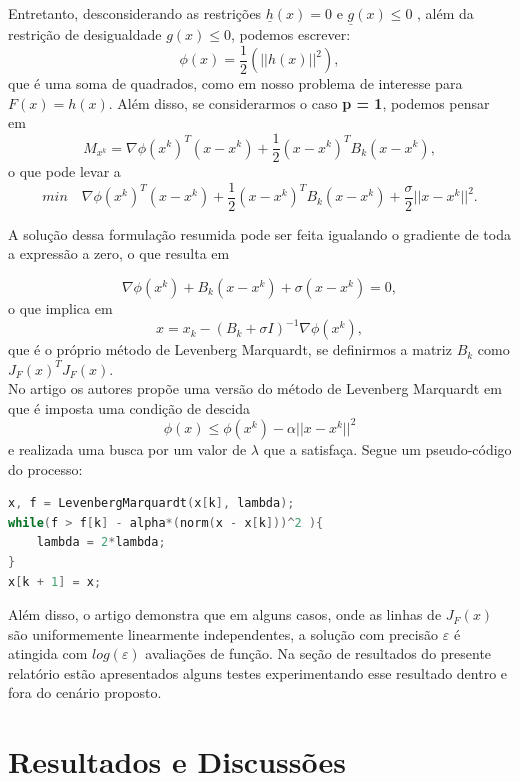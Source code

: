 \documentclass[11pt]{article}
\begin{document}
\noindent
Entretanto, desconsiderando as restrições $\underline{h}(x) = 0$ e $\underline{g}(x) \leq 0$ , além da restrição de desigualdade $g(x) \leq 0$, podemos escrever:
$$\phi (x) = \frac{1}{2}(||h(x)||^2),$$ que é uma soma de quadrados, como em nosso problema de interesse para $F(x)=h(x)$. Além disso, se considerarmos o caso \textbf{p = 1}, podemos pensar em $$M_{x^k} = \nabla \phi(x^k)^T (x - x^k) + \frac{1}{2}(x - x^k)^T B_k (x - x^k),$$ o que pode levar a
$$min \quad \nabla \phi(x^k)^T (x - x^k) + \frac{1}{2}(x - x^k)^T B_k (x - x^k) + \frac{\sigma}{2} ||x - x^k||^2.$$


\noindent
A solução dessa formulação resumida pode ser feita igualando o gradiente de toda a expressão a zero, o que resulta em 

$$\nabla \phi(x^k) + B_k (x - x^k) + \sigma(x - x^k) = 0, $$ 
o que implica em 
$$x = x_k - (B_k + \sigma I)^{-1} \nabla \phi(x^k), $$ que é o próprio método de Levenberg Marquardt, se definirmos a matriz $B_k$ como $J_{F}(x)^T J_{F}(x)$.\\ 


\noindent
No artigo \cite{bmLS} os autores propõe uma versão do método de Levenberg Marquardt em que é imposta uma condição de descida
$$\phi(x) \leq \phi(x^k) - \alpha ||x - x^k||^2$$ e realizada uma busca por um valor de $\lambda$ que a satisfaça. Segue um pseudo-código do processo:

\begin{lstlisting}[language=C, caption=Levenberg Marquardt com busca linear]
x, f = LevenbergMarquardt(x[k], lambda);
while(f > f[k] - alpha*(norm(x - x[k]))^2 ){
	lambda = 2*lambda;
}
x[k + 1] = x;
\end{lstlisting}


\noindent
Além disso, o artigo demonstra \cite{bmLS} que em alguns casos, onde as linhas de $J_F(x)$ são uniformemente linearmente independentes, a solução com precisão $\varepsilon$ é atingida com $log (\varepsilon)$ avaliações de função. Na seção de resultados do presente relatório estão apresentados alguns testes experimentando esse resultado dentro e fora do cenário proposto.
\newpage
\section{Resultados e Discussões}
\end{document}
